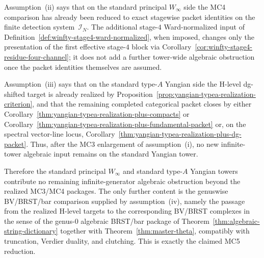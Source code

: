 \begin{remark}
Assumption~\textup{(ii)} says that on the standard principal
\texorpdfstring{$W_\infty$}{W_infty} side the MC4 comparison has
already been reduced to exact stagewise packet identities on the finite
detection system~$\mathcal{I}_N$. The additional
stage-$4$ Ward-normalized input of
Definition~\ref{def:winfty-stage4-ward-normalized}, when imposed,
changes only the presentation of the first effective stage-$4$ block via
Corollary~\ref{cor:winfty-stage4-residue-four-channel}; it does not add
a further tower-wide algebraic obstruction once the packet identities
themselves are assumed.

Assumption~\textup{(iii)} says that on the standard type-$A$ Yangian
side the H-level dg-shifted target is already realized by
Proposition~\ref{prop:yangian-typea-realization-criterion}, and that
the remaining completed categorical packet closes by either
Corollary~\ref{thm:yangian-typea-realization-plus-compacts} or
Corollary~\ref{thm:yangian-typea-realization-plus-fundamental-packet}
or, on the spectral vector-line locus,
Corollary~\ref{thm:yangian-typea-realization-plus-dg-packet}.
Thus, after the MC3 enlargement of assumption~\textup{(i)}, no new
infinite-tower algebraic input remains on the standard Yangian tower.

Therefore the standard principal \texorpdfstring{$W_\infty$}{W_infty}
and standard type-$A$ Yangian towers contribute no remaining
infinite-generator algebraic obstruction beyond the realized MC3/MC4
packages. The only further content is the genuswise BV/BRST/bar
comparison supplied by assumption~\textup{(iv)}, namely the passage
from the realized H-level targets to the corresponding BV/BRST
complexes in the sense of the genus-$0$ algebraic BRST/bar package of
Theorem~\ref{thm:algebraic-string-dictionary} together with
Theorem~\ref{thm:master-theta}, compatibly with truncation, Verdier
duality, and clutching. This is exactly the claimed MC5 reduction.
\end{remark}

